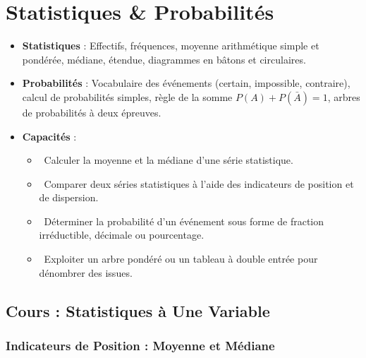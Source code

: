 \chapter{Statistiques \& Probabilités}
\label{chap:stats_probas}

\begin{cadreretenu}
\begin{itemize}
    \item \textbf{Statistiques} : Effectifs, fréquences, moyenne arithmétique simple et pondérée, médiane, étendue, diagrammes en bâtons et circulaires.
    \item \textbf{Probabilités} : Vocabulaire des événements (certain, impossible, contraire), calcul de probabilités simples, règle de la somme $P(A) + P(\bar{A}) = 1$, arbres de probabilités à deux épreuves.
    \item \textbf{Capacités} :
    \begin{itemize}
        \item \capRealiser\ Calculer la moyenne et la médiane d'une série statistique.
        \item \capAnalyser\ Comparer deux séries statistiques à l'aide des indicateurs de position et de dispersion.
        \item \capRealiser\ Déterminer la probabilité d'un événement sous forme de fraction irréductible, décimale ou pourcentage.
        \item \capValider\ Exploiter un arbre pondéré ou un tableau à double entrée pour dénombrer des issues.
    \end{itemize}
\end{itemize}
\end{cadreretenu}

\vspace{0.3cm}

\section{Cours : Statistiques à Une Variable}

\subsection{Indicateurs de Position : Moyenne et Médiane}

